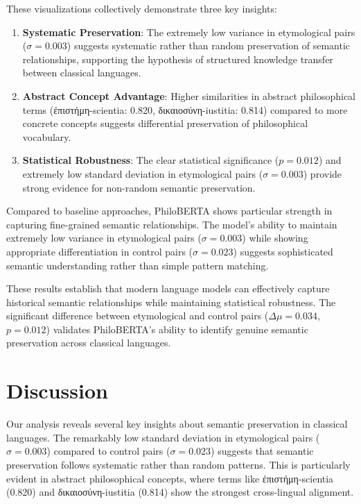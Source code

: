 \documentclass[11pt]{article} %
\begin{document}
These visualizations collectively demonstrate three key insights:

\begin{enumerate}
\item \textbf{Systematic Preservation}: The extremely low variance in etymological pairs ($\sigma = 0.003$) suggests systematic rather than random preservation of semantic relationships, supporting the hypothesis of structured knowledge transfer between classical languages.

\item \textbf{Abstract Concept Advantage}: Higher similarities in abstract philosophical terms (ἐπιστήμη-scientia: 0.820, δικαιοσύνη-iustitia: 0.814) compared to more concrete concepts suggests differential preservation of philosophical vocabulary.

\item \textbf{Statistical Robustness}: The clear statistical significance ($p = 0.012$) and extremely low standard deviation in etymological pairs ($\sigma = 0.003$) provide strong evidence for non-random semantic preservation.
\end{enumerate}

Compared to baseline approaches, PhiloBERTA shows particular strength in capturing fine-grained semantic relationships. The model's ability to maintain extremely low variance in etymological pairs ($\sigma = 0.003$) while showing appropriate differentiation in control pairs ($\sigma = 0.023$) suggests sophisticated semantic understanding rather than simple pattern matching.

These results establish that modern language models can effectively capture historical semantic relationships while maintaining statistical robustness. The significant difference between etymological and control pairs ($\Delta\mu = 0.034$, $p = 0.012$) validates PhiloBERTA's ability to identify genuine semantic preservation across classical languages.

\section{Discussion}
Our analysis reveals several key insights about semantic preservation in classical languages. The remarkably low standard deviation in etymological pairs ($\sigma = 0.003$) compared to control pairs ($\sigma = 0.023$) suggests that semantic preservation follows systematic rather than random patterns. This is particularly evident in abstract philosophical concepts, where terms like ἐπιστήμη-scientia (0.820) and δικαιοσύνη-iustitia (0.814) show the strongest cross-lingual alignment.
\end{document}
